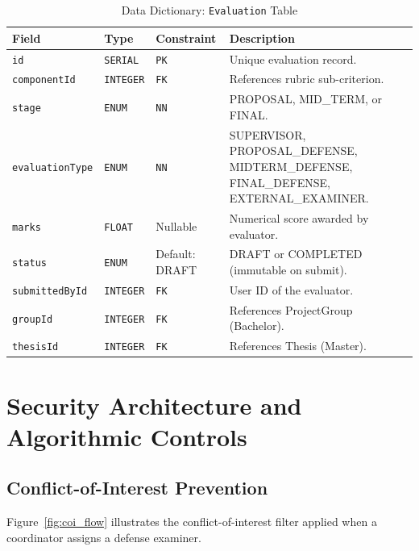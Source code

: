 \begin{table}[H]
\centering
\footnotesize
\caption{Data Dictionary: \texttt{Evaluation} Table}
\label{tab:schema_eval}
\vspace{4pt}
\begin{tabularx}{\textwidth}{|l|l|l|X|}
\hline
\textbf{Field} & \textbf{Type} & \textbf{Constraint} & \textbf{Description} \\
\hline
\texttt{id} & \texttt{SERIAL} & \texttt{PK} & Unique evaluation record. \\
\texttt{componentId} & \texttt{INTEGER} & \texttt{FK} & References rubric sub-criterion. \\
\texttt{stage} & \texttt{ENUM} & \texttt{NN} & PROPOSAL, MID\_TERM, or FINAL. \\
\texttt{evaluationType} & \texttt{ENUM} & \texttt{NN} & SUPERVISOR, PROPOSAL\_DEFENSE, MIDTERM\_DEFENSE, FINAL\_DEFENSE, EXTERNAL\_EXAMINER. \\
\texttt{marks} & \texttt{FLOAT} & Nullable & Numerical score awarded by evaluator. \\
\texttt{status} & \texttt{ENUM} & Default: DRAFT & DRAFT or COMPLETED (immutable on submit). \\
\texttt{submittedById} & \texttt{INTEGER} & \texttt{FK} & User ID of the evaluator. \\
\texttt{groupId} & \texttt{INTEGER} & \texttt{FK} & References ProjectGroup (Bachelor). \\
\texttt{thesisId} & \texttt{INTEGER} & \texttt{FK} & References Thesis (Master). \\
\hline
\end{tabularx}
\end{table}

\section{Security Architecture and Algorithmic Controls}

\subsection{Conflict-of-Interest Prevention}
Figure~\ref{fig:coi_flow} illustrates the conflict-of-interest filter applied when a coordinator assigns a defense examiner.

